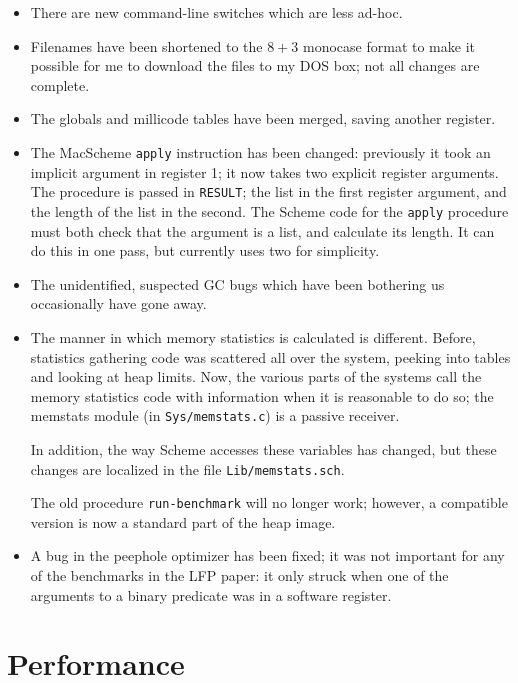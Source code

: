 \begin{itemize}
\item
There are new command-line switches which are less ad-hoc.

\item
Filenames have been shortened to the $8+3$ monocase format to make it possible
for me to download the files to my DOS box; not all changes are complete.

\item
The globals and millicode tables have been merged, saving another register.

\item
The MacScheme {\tt apply} instruction has been changed: previously it took
an implicit argument in register 1; it now takes two explicit register 
arguments. The procedure is passed in {\tt RESULT}; the list in the first
register argument, and the length of the list in the second. The Scheme
code for the {\tt apply} procedure must both check that the argument is
a list, and calculate its length. It can do this in one pass, but currently
uses two for simplicity.

\item
The unidentified, suspected GC bugs which have been bothering us occasionally
have gone away.

\item
The manner in which memory statistics is calculated is different. Before,
statistics gathering code was scattered all over the system, peeking into
tables and looking at heap limits. Now, the various parts of the systems
call the memory statistics code with information when it is reasonable
to do so; the memstats module (in {\tt Sys/memstats.c}) is a passive
receiver.

In addition, the way Scheme accesses these variables has changed, but these
changes are localized in the file {\tt Lib/memstats.sch}.

The old procedure {\tt run-benchmark} will no longer work; however, a
compatible version is now a standard part of the heap image.

\item
A bug in the peephole optimizer has been fixed; it was not important for
any of the benchmarks in the LFP paper: it only struck when one of the
arguments to a binary predicate was in a software register.

\end{itemize}

\section{Performance}

